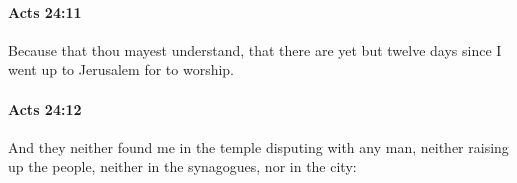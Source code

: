 		\paragraph{Acts 24:11} %
			\label{ACTS-24-11}

			Because that thou mayest understand, that there are yet but twelve days since I went up to Jerusalem for to worship.

			\begin{framed}
			\scriptsize
				\begin{compactdesc}
					\item[SBLG] 
				\end{compactdesc}
			\end{framed}

		\paragraph{Acts 24:12} %
			\label{ACTS-24-12}

			And they neither found me in the temple disputing with any man, neither raising up the people, neither in the synagogues, nor in the city:

